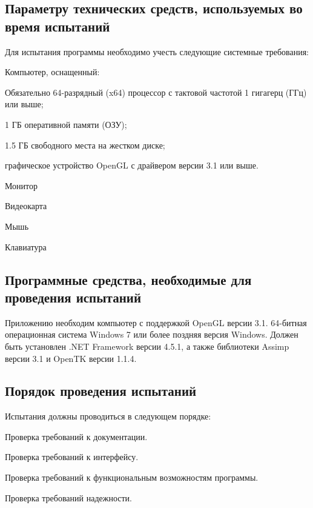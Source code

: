 \subsection{Параметру технических средств, используемых во время испытаний}
Для испытания программы необходимо учесть следующие системные требования:
\begin{my_enumerate}
\item Компьютер, оснащенный:
    \begin{my_enumerate}
    \item Обязательно 64-разрядный (x64) процессор с тактовой частотой 1 гигагерц (ГГц) или выше;
    \item 1 ГБ оперативной памяти (ОЗУ);
    \item 1.5 ГБ свободного места на жестком диске;
    \item графическое устройство OpenGL с драйвером версии 3.1 или выше.
    \end{my_enumerate}
\item Монитор
\item Видеокарта
\item Мышь
\item Клавиатура
\end{my_enumerate}


\subsection{Программные средства, необходимые для проведения испытаний}
Приложению необходим компьютер с поддержкой OpenGL версии 3.1. 64-битная операционная система Windows 7 или более поздняя версия Windows. Должен быть установлен .NET Framework версии 4.5.1, а также библиотеки Assimp версии 3.1 и OpenTK версии 1.1.4.

\subsection{Порядок проведения испытаний}
Испытания должны проводиться в следующем порядке:
\begin{my_enumerate}
\item Проверка требований к документации.
\item Проверка требований к интерфейсу.
\item Проверка требований к функциональным возможностям программы.
\item Проверка требований надежности.
\end{my_enumerate}



